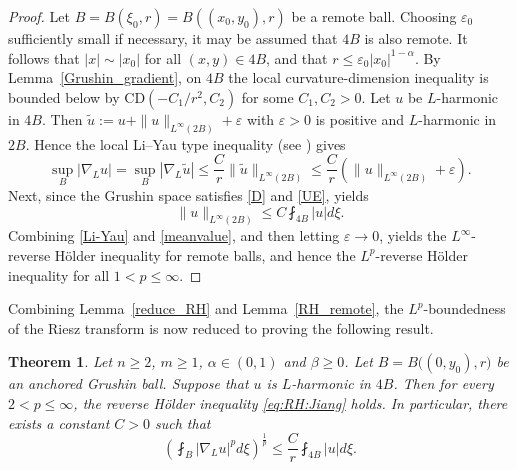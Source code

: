 \documentclass[12pt]{amsart}
\newtheorem{theorem}{Theorem}[section]
\begin{document}
\begin{proof}
Let $B=B(\xi_0,r)=B((x_0,y_0),r)$ be a remote ball. Choosing $\varepsilon_0$ sufficiently small if necessary, it may be assumed that $4B$ is also remote. It follows that $|x| \sim |x_0|$ for all $(x,y) \in 4B$, and that $r \le \varepsilon_0 |x_0|^{1-\alpha}$. By Lemma~\ref{Grushin_gradient}, on $4B$ the local curvature-dimension inequality is bounded below by $\mathrm{CD}(-C_1/r^{2}, C_2)$ for some $C_1,C_2>0$. Let $u$ be $L$-harmonic in $4B$. Then $\widetilde{u}:=u+\|u\|_{L^\infty(2B)}+\varepsilon$ with $\varepsilon>0$ is positive and $L$-harmonic in $2B$. Hence the local Li--Yau type inequality (see \cite[Theorem~1.4]{ZZ}) gives
\begin{equation}\label{Li-Yau}
   \sup_B |\nabla_L u| = \sup_B |\nabla_L \widetilde{u}| \le \frac{C}{r} \|\widetilde{u}\|_{L^\infty(2B)}\le \frac{C}{r} \left(\|u\|_{L^\infty(2B)}+\varepsilon\right).
\end{equation}
Next, since the Grushin space satisfies \eqref{D} and \eqref{UE}, \cite[Proposition~2.1]{CJKS} yields
\begin{equation}\label{meanvalue}
    \|u\|_{L^\infty(2B)} \le C \fint_{4B} |u| d\xi.
\end{equation}
Combining \eqref{Li-Yau} and \eqref{meanvalue}, and then letting $\varepsilon \to 0$, yields the $L^\infty$-reverse H\"older inequality for remote balls, and hence the $L^p$-reverse H\"older inequality for all $1<p\le \infty$.
\end{proof}


Combining Lemma~\ref{reduce_RH} and Lemma~\ref{RH_remote}, the $L^p$-boundedness of the Riesz transform is now reduced to proving the following result.



\begin{theorem}\label{thm:RH}
Let $n\ge 2$, $m\ge 1$, $\alpha\in (0,1)$ and $\beta \ge 0$. Let $B=B\big((0,y_0), r\big)$ be an anchored Grushin ball. Suppose that $u$ is $L$-harmonic in $4B$. Then for every $2<p\le \infty$, the reverse H\"older inequality \eqref{eq:RH:Jiang} holds. In particular, there exists a constant $C>0$ such that
\begin{equation*}
    \left( \fint_B |\nabla_L u|^p d\xi \right)^{\frac{1}{p}} \le  \frac{C}{r} \fint_{4B} |u| d\xi.
\end{equation*}
\end{theorem}
\end{document}
